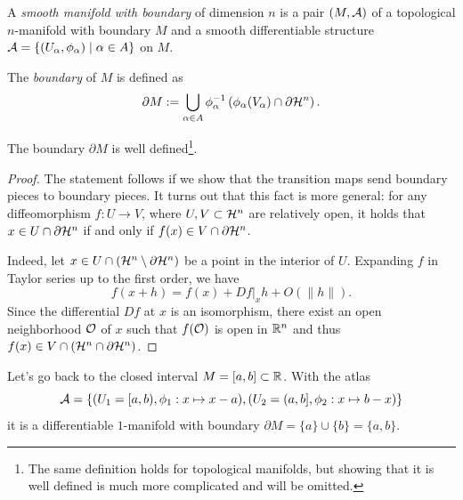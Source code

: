 \begin{defn}\label{def:diffmanifoldwb}
  A \emph{smooth manifold with boundary} of dimension $n$ is a pair $(M, \mathcal{A})$ of a topological $n$-manifold with boundary $M$ and a smooth differentiable structure $\mathcal{A} = \{(U_\alpha, \phi_\alpha) \mid \alpha\in A\}$ on $M$.
  
  The \emph{boundary} of $M$ is defined as
  \begin{equation}\label{def:bdry}
    \partial M := \bigcup_{\alpha\in A} \phi_\alpha^{-1}\left(\phi_\alpha(V_\alpha)\cap \partial\mathcal{H}^n\right).
  \end{equation}
\end{defn}

\begin{prop}\label{prop:bdwelldef}
  The boundary $\partial M$ is well defined\footnote{The same definition holds for topological manifolds, but showing that it is well defined is much more complicated and will be omitted.}.
\end{prop}
\begin{proof}
  The statement follows if we show that the transition maps send boundary pieces to boundary pieces.
  It turns out that this fact is more general: for any diffeomorphism $f:U \to V$, where $U,V \subset\mathcal{H}^n$ are relatively open, it holds that $x\in U\cap\partial\mathcal{H}^n$ if and only if $f(x)\in V\cap\partial\mathcal{H}^n$.

  Indeed, let $x\in U\cap(\mathcal{H}^n\setminus\partial\mathcal{H}^n)$ be a point in the interior of $U$. Expanding $f$ in Taylor series up to the first order, we have
  \begin{equation}
    f(x+h) = f(x) + Df|_x h + O(\|h\|).
  \end{equation}
  Since the differential $D f$ at $x$ is an isomorphism, there exist an open neighborhood $\mathcal{O}$ of $x$ such that $f(\mathcal{O})$ is open in $\mathbb{R}^n$ and thus $f(x)\in V\cap(\mathcal{H}^n\cap\partial\mathcal{H}^n)$.
\end{proof}

\begin{ex}
  Let's go back to the closed interval $M=[a,b]\subset\mathbb{R}$. 
  With the atlas
  \begin{equation}
    \mathcal{A}=\left\{
      (U_1 = [a,b), \phi_1: x\mapsto x-a),
      (U_2 = (a,b], \phi_2: x\mapsto b-x)
    \right\}
  \end{equation}
  it is a differentiable $1$-manifold with boundary $\partial M = \{a\} \cup \{b\} = \{a, b\}$.
\end{ex}


